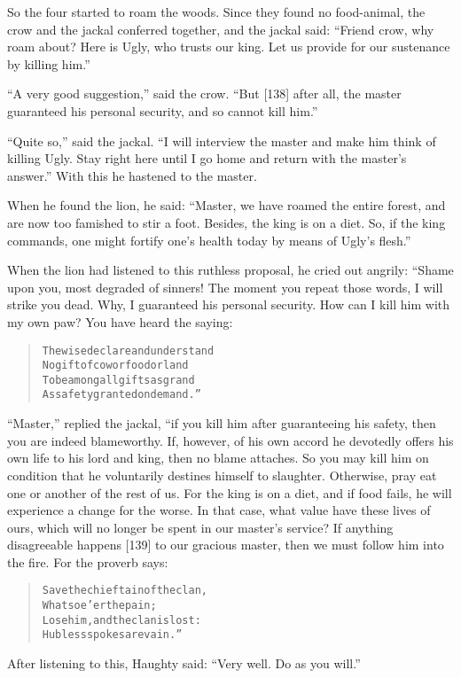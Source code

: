 \documentclass[article, twoside, 14pt]{memoir}
\renewenvironment{verbatim}{%
\begin{quote}%
\vskip -10pt%
\begin{alltt}\normalfont\large}{\end{alltt}%
\end{quote}%
\vskip -10pt
} %
\begin{document}
So the four started to roam the woods. Since they found no
food-animal, the crow and the jackal conferred together, and the
jackal said:
``Friend crow, why roam about? Here is Ugly, who trusts our king. Let us provide for our sustenance by killing him.''

``A very good suggestion,'' said the crow.
``But [138] after all, the master guaranteed his personal security, and so cannot kill him.''

``Quite so,'' said the jackal.
``I will interview the master and make him think of killing Ugly. Stay right here until I go home and return with the master's answer.''
With this he hastened to the master.

When he found the lion, he said:
``Master, we have roamed the entire forest, and are now too famished to stir a foot. Besides, the king is on a diet. So, if the king commands, one might fortify one's health today by means of Ugly's flesh.''

When the lion had listened to this ruthless proposal, he cried out
angrily: “Shame upon you, most degraded of sinners! The moment you
repeat those words, I will strike you dead. Why, I guaranteed his
personal security. How can I kill him with my own paw? You have
heard the saying:

\begin{verbatim}
The wise declare and understand
No gift of cow or food or land
To be among all gifts as grand
As safety granted on demand.”
\end{verbatim}
``Master,'' replied the jackal, “if you kill him after guaranteeing
his safety, then you are indeed blameworthy. If, however, of his
own accord he devotedly offers his own life to his lord and king,
then no blame attaches. So you may kill him on condition that he
voluntarily destines himself to slaughter. Otherwise, pray eat one
or another of the rest of us. For the king is on a diet, and if
food fails, he will experience a change for the worse. In that
case, what value have these lives of ours, which will no longer be
spent in our master's service? If anything disagreeable happens
[139] to our gracious master, then we must follow him into the
fire. For the proverb says:

\begin{verbatim}
Save the chieftain of the clan,
    Whatsoe'er the pain;
Lose him, and the clan is lost:
    Hubless spokes are vain.”
\end{verbatim}
After listening to this, Haughty said:
``Very well. Do as you will.''
\end{document}
